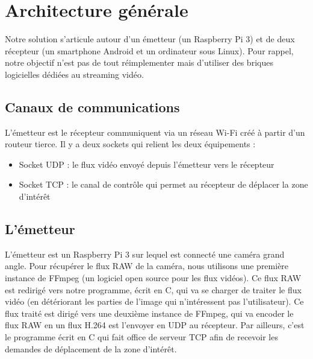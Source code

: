 \documentclass[11pt,a4paper]{article}
\begin{document}
\section{Architecture générale}
Notre solution s'articule autour d'un émetteur (un Raspberry Pi 3) et de deux récepteur (un smartphone Android et un ordinateur sous Linux).
Pour rappel, notre objectif n'est pas de tout réimplementer mais d'utiliser des briques logicielles dédiées au streaming vidéo.

\subsection{Canaux de communications}
L'émetteur est le récepteur communiquent via un réseau Wi-Fi créé à partir d'un routeur tierce.
Il y a deux sockets qui relient les deux équipements :

\bigbreak
\begin{itemize}
\item{Socket UDP : le flux vidéo envoyé depuis l'émetteur vers le récepteur}
\item{Socket TCP : le canal de contrôle qui permet au récepteur de déplacer la zone d'intérêt}
\end{itemize}

\subsection{L'émetteur}
L'émetteur est un Raspberry Pi 3 sur lequel est connecté une caméra grand angle.
Pour récupérer le flux RAW de la caméra, nous utilisons une première instance de FFmpeg (un logiciel open source pour les flux vidéos).
Ce flux RAW est redirigé vers notre programme, écrit en C, qui va se charger de traiter le flux vidéo (en détériorant les parties de l'image qui n'intéressent pas l'utilisateur).
Ce flux traité est dirigé vers une deuxième instance de FFmpeg, qui va encoder le flux RAW en un flux H.264 est l'envoyer en UDP au récepteur.
Par ailleurs, c'est le programme écrit en C qui fait office de serveur TCP afin de recevoir les demandes de déplacement de la zone d'intérêt.
\end{document}
